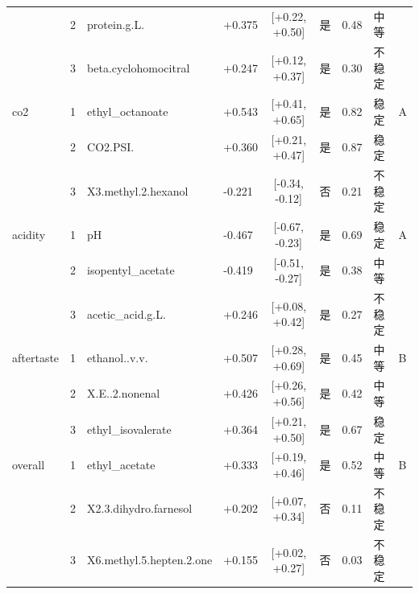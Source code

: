 \begin{longtable}{llllcccll}
 & 2 & protein.g.L. & +0.375 & [+0.22, +0.50] & 是 & 0.48 & 中等 &  \\
 & 3 & beta.cyclohomocitral & +0.247 & [+0.12, +0.37] & 是 & 0.30 & 不稳定 &  \\
co2 & 1 & ethyl\_octanoate & +0.543 & [+0.41, +0.65] & 是 & 0.82 & 稳定 & A \\
 & 2 & CO2.PSI. & +0.360 & [+0.21, +0.47] & 是 & 0.87 & 稳定 &  \\
 & 3 & X3.methyl.2.hexanol & -0.221 & [-0.34, -0.12] & 否 & 0.21 & 不稳定 &  \\
acidity & 1 & pH & -0.467 & [-0.67, -0.23] & 是 & 0.69 & 稳定 & A \\
 & 2 & isopentyl\_acetate & -0.419 & [-0.51, -0.27] & 是 & 0.38 & 中等 &  \\
 & 3 & acetic\_acid.g.L. & +0.246 & [+0.08, +0.42] & 是 & 0.27 & 不稳定 &  \\
aftertaste & 1 & ethanol..v.v. & +0.507 & [+0.28, +0.69] & 是 & 0.45 & 中等 & B \\
 & 2 & X.E..2.nonenal & +0.426 & [+0.26, +0.56] & 是 & 0.42 & 中等 &  \\
 & 3 & ethyl\_isovalerate & +0.364 & [+0.21, +0.50] & 是 & 0.67 & 稳定 &  \\
overall & 1 & ethyl\_acetate & +0.333 & [+0.19, +0.46] & 是 & 0.52 & 中等 & B \\
 & 2 & X2.3.dihydro.farnesol & +0.202 & [+0.07, +0.34] & 否 & 0.11 & 不稳定 &  \\
 & 3 & X6.methyl.5.hepten.2.one & +0.155 & [+0.02, +0.27] & 否 & 0.03 & 不稳定 &  \\
\end{longtable}
